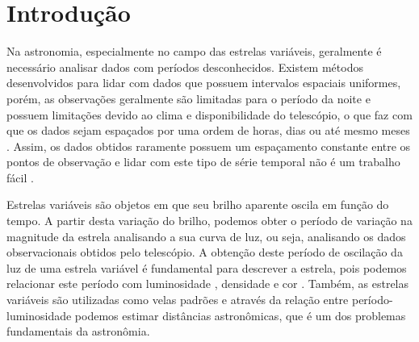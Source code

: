 \chapter{Introdu\c{c}ão}


Na astronomia, especialmente no campo das estrelas variáveis, geralmente é necessário analisar dados com períodos desconhecidos. Existem métodos desenvolvidos para lidar com dados que possuem intervalos espaciais uniformes, porém, as observações geralmente são limitadas para o período da noite e possuem limitações devido ao clima e disponibilidade do telescópio, o que faz com que os dados sejam espaçados por uma ordem de horas, dias ou até mesmo meses \citep{mello81}. 
Assim, os dados obtidos raramente possuem um espaçamento constante entre os pontos de observação e lidar com este tipo de série temporal não é um trabalho fácil \citep{lomb}.


Estrelas variáveis são objetos em que seu brilho aparente oscila em função do tempo. A partir desta variação do brilho, podemos obter o período de variação na magnitude da estrela analisando a sua curva de luz, ou seja, analisando os dados observacionais obtidos pelo telescópio. A obtenção deste período de oscilação da luz de uma estrela variável é fundamental para descrever a estrela, pois podemos relacionar este período com luminosidade \citep{Leavitt1912}, densidade \citep{Payne1930} e cor \citep{Kraft1960}. Também, as estrelas variáveis são utilizadas como velas padrões e através da relação entre período-luminosidade podemos estimar distâncias astronômicas, que é um dos problemas fundamentais da astronômia.



